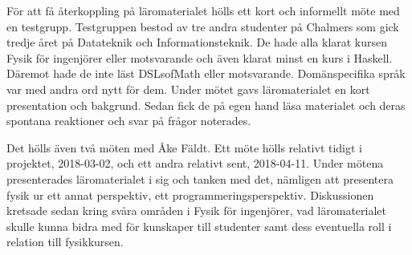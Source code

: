 För att få återkoppling på läromaterialet hölls ett kort och informellt möte med
en testgrupp. Testgruppen bestod av tre andra studenter på Chalmers som gick
tredje året på Datateknik och Informationsteknik. De hade alla klarat kursen Fysik för
ingenjörer eller motsvarande och även klarat minst en kurs i Haskell.
Däremot hade de inte läst DSLsofMath eller motsvarande. Domänspecifika språk var
med andra ord nytt för dem. Under mötet gavs läromaterialet en kort presentation och bakgrund. Sedan fick de på egen hand läsa materialet och deras
spontana reaktioner och svar på frågor noterades.

Det hölls även två möten med Åke Fäldt. Ett möte hölls relativt
tidigt i projektet, 2018-03-02, och ett andra relativt sent, 2018-04-11.
Under mötena presenterades läromaterialet i sig och tanken med det, nämligen att
presentera fysik ur ett annat perspektiv, ett
programmeringsperspektiv. Diskussionen kretsade sedan kring svåra områden i Fysik för
ingenjörer, vad läromaterialet skulle kunna
bidra med för kunskaper till studenter samt dess eventuella roll i relation till
fysikkursen.
